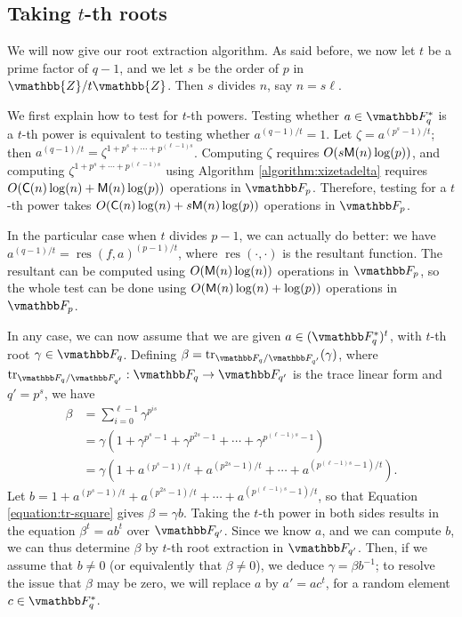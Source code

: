 
\subsection{Taking $t$-th roots} 

We will now give our root extraction algorithm. As said before, we now
let $t$ be a prime factor of $q-1$, and we let $s$ be the order of $p$
in $\vmathbb{Z}/t\vmathbb{Z}$. Then $s$ divides $n$, say $n = s\ell$.

We first explain how to test for $t$-th powers. Testing whether $a
\in \F_q^*$ is a $t$-th power is equivalent to testing whether
$a^{(q-1)/t}=1$. Let $\zeta = a^{(p^s - 1) / t}$; then $a^{(q - 1) /
  t} = \zeta^{1 + p^s + \cdots + p^{(\ell - 1)s}}$. Computing $\zeta$
requires $O(s\mathsf{M}(n)\log(p))$, and computing $\zeta^{1 + p^s + \cdots +
  p^{(\ell - 1)s}}$ using Algorithm \ref{algorithm:xizetadelta}
requires $O(\mathsf{C}(n)\log(n) + \mathsf{M}(n)\log(p))$ operations in
$\F_p$. Therefore, testing for a $t$-th power takes $O(\mathsf{C}(n)\log(n) +
s\mathsf{M}(n)\log(p))$ operations in $\F_p$.

In the particular case when $t$ divides $p - 1$, we can actually do
better: we have $a^{(q - 1) / t} = \operatorname{res}(f, a)^{(p - 1) /
  t}$, where $\operatorname{res}(\cdot, \cdot)$ is the resultant
function. The resultant can be computed using $O(\mathsf{M}(n)\log(n))$
operations in $\F_p$, so the whole test can be done using
$O(\mathsf{M}(n)\log(n)+\log(p))$ operations in $\F_p$.

In any case, we can now assume that we are given $a \in (\F_q^*)^t$,
with $t$-th root $\gamma \in \F_q$. 
Defining $\beta = \trace_{\F_q / \F_{q'}}(\gamma)$, where
$\trace_{\F_q / \F_{q'}}:\F_q \to \F_{q'}$ is the trace linear form and
$q' = p^s$, we have
\begin{align}
\label{equation:tr-square}
\beta 
& = \sum_{i = 0}^{\ell - 1} \gamma^{p^{is}} \nonumber \\
& = \gamma(1 + \gamma^{p^s - 1} + \gamma^{p^{2s} - 1} + \cdots + \gamma^{p^{(\ell - 1)s} - 1}) \nonumber \\
& = \gamma(1 + a^{(p^s - 1) / t} + a^{(p^{2s} - 1) / t} + \cdots + a^{(p^{(\ell - 1)s} -1) / t}).
\end{align}
Let $b = 1 + a^{(p^s - 1) / t} + a^{(p^{2s} - 1) / t} + \cdots +
a^{(p^ {(\ell - 1)s} -1) / t}$, so that
Equation \ref{equation:tr-square} gives $\beta = \gamma b$.  Taking the
$t$-th power in both sides results in the equation $\beta^t = ab^t$
over $\F_{q'}$. Since we know $a$, and we can compute $b$, we can thus
determine $\beta$ by $t$-th root extraction in $\F_{q'}$. Then, if we
assume that $b \ne 0$ (or equivalently that $\beta \ne 0$), we deduce
$\gamma = \beta b^{-1}$; to resolve the issue that $\beta$ may be
zero, we will replace $a$ by $a'=ac^t$, for a random element $c \in
\F_q^*$.

